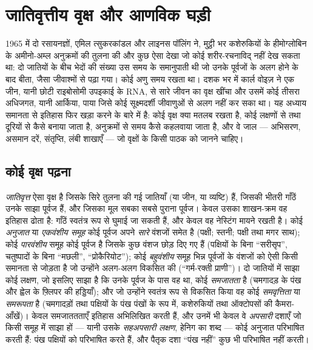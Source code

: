 \chapter{जातिवृत्तीय वृक्ष और आणविक घड़ी}\label{ch:b2:phylogenetic-trees}

1965 में दो रसायनज्ञों, एमिल त्सुकरकांडल और लाइनस पॉलिंग ने,
मुट्ठी भर कशेरुकियों के हीमोग्लोबिन के अमीनो-अम्ल अनुक्रमों की तुलना की
और कुछ ऐसा देखा जो कोई शरीर-रचनाविद् नहीं देख सकता था:
दो जातियों के बीच भेदों की संख्या उस समय के समानुपाती थी
जो उनके पूर्वजों के अलग होने के बाद बीता, जैसा जीवाश्मों से पढ़ा गया।
कोई अणु समय रखता था। दशक भर में कार्ल वोइज़ ने एक जीन,
यानी छोटी राइबोसोमी उपइकाई के RNA, से सारे जीवन का वृक्ष
खींचा और उसमें कोई तीसरा अधिजगत, यानी आर्किया, पाया जिसे कोई
सूक्ष्मदर्शी जीवाणुओं से अलग नहीं कर सका था। यह अध्याय
समानता से इतिहास फिर खड़ा करने के बारे में है: कोई वृक्ष क्या मतलब रखता है, कोई
लक्षणों से तथा दूरियों से कैसे बनाया जाता है, अनुक्रमों से समय कैसे
कहलवाया जाता है, और वे जाल --- अभिसरण, असमान दरें,
संतृप्ति, लंबी शाखाएँ --- जो वृक्षों के किसी पाठक को जानने चाहिए।

\section{कोई वृक्ष पढ़ना}

\begin{definition}[जातिवृत्त, अनुजात, समजातता]\label{def:b2:phylogenetic-trees:tree}
\emph{जातिवृत्त} ऐसा वृक्ष है जिसके सिरे तुलना की गई जातियाँ (या जीन,
या व्यष्टि) हैं, जिसकी भीतरी गाँठें उनके साझा
पूर्वज हैं, और जिसका मूल सबका सबसे पुराना पूर्वज। केवल उसका
शाखन-क्रम वह इतिहास ढोता है: गाँठें स्वतंत्र रूप से घुमाई जा सकती हैं,
और केवल वह नेस्टिंग मायने रखती है। कोई \emph{अनुजात} या
\emph{एकवंशीय समूह} कोई पूर्वज अपने \emph{सारे}
वंशजों समेत है (पक्षी; स्तनी; पक्षी तथा मगर साथ);
कोई \emph{पारवंशीय} समूह कोई पूर्वज है जिसके कुछ वंशज
छोड़ दिए गए हैं (पक्षियों के बिना ``सरीसृप'', चतुष्पादों के बिना ``मछली'',
``प्रोकैरियोट''); कोई \emph{बहुवंशीय} समूह भिन्न पूर्वजों के वंशजों को
ऐसी किसी समानता से जोड़ता है जो उन्होंने अलग-अलग विकसित की
(``गर्म-रक्ती प्राणी'')। दो जातियों में साझा कोई लक्षण, जो इसलिए साझा है
कि उनके पूर्वज के पास वह था, कोई \emph{समजातता} है (चमगादड़ के पंख और
ह्वेल के फ़्लिपर की हड्डियाँ); और जो उन्होंने
स्वतंत्र रूप से विकसित किया वह कोई \emph{समवृत्तिता} या \emph{समरूपता} है (चमगादड़ों तथा
पक्षियों के पंख पंखों के रूप में, कशेरुकियों तथा
ऑक्टोपसों की कैमरा-आँखें)। केवल समजाततताएँ इतिहास अभिलिखित करती हैं, और उनमें भी केवल
वे \emph{अपसारी} दशाएँ जो किसी समूह में साझा हों --- यानी उसके
\emph{सहअपसारी लक्षण}, हेनिग का शब्द --- कोई अनुजात परिभाषित करती हैं: पंख
पक्षियों को परिभाषित करते हैं, और पैतृक दशा ``पंख नहीं'' कुछ भी परिभाषित नहीं करती।
\end{definition}

